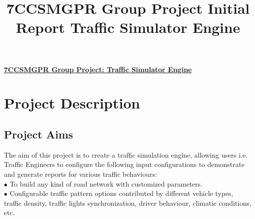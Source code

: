 \documentclass[11pt]{article}
\begin{document}



\title{\textbf{7CCSMGPR Group Project}
\textbf{Initial Report} \textbf{Traffic Simulator Engine}}






\begin{center}
\underline{ \textbf{7CCSMGPR Group Project: Traffic Simulator Engine} }
\end{center}

\section{Project Description}\label{PD}
	
	\subsection{Project Aims}\label{Aims}
	The aim of this project is to create a traffic simulation engine, allowing users i.e. Traffic Engineers to configure the following input configurations to demonstrate and generate reports for various traffic behaviours:\\
		$\bullet$ To build any kind of road network with customized parameters.\\
		$\bullet$ Configurable traffic pattern options contributed by different vehicle types, traffic density, traffic lights synchronization, driver behaviour, climatic conditions, etc.
		
\end{document}
